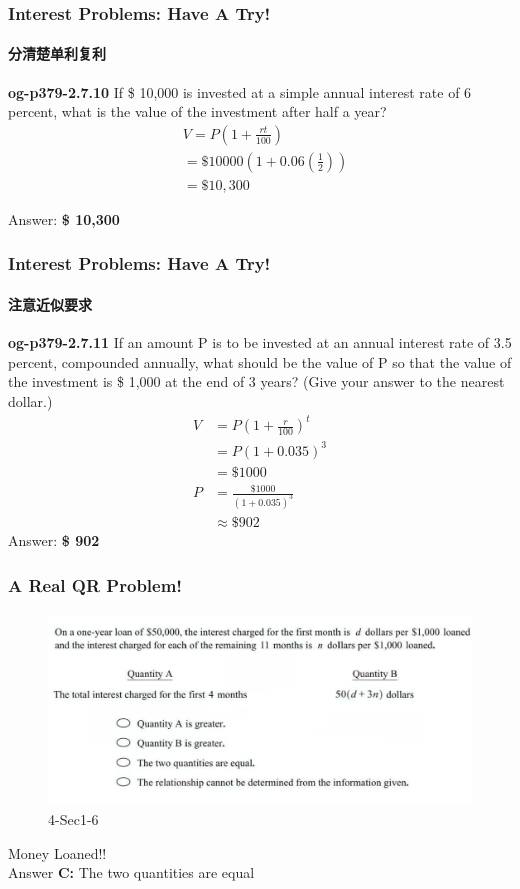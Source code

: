 \documentclass[
	11pt, %
	handout,
]{beamer}
\begin{document}


\begin{frame}
	\frametitle{Interest Problems: Have A Try!}
	\framesubtitle{分清楚单利复利}
	\textbf{og-p379-2.7.10}
If \$ 10,000 is invested at a simple annual interest rate of 6 percent, what is the value of the investment after half a year?
	\bigskip
	\pause
	\begin{equation*}
	  \begin{aligned}
	  		&V =P(1 + \frac{rt}{100})\\
		    &= \$ 10000(1+0.06 (\frac{1}{2}))\\
		    &= \$ 10,300
	  \end{aligned}
	\end{equation*}

	\pause
	\bigskip
	Answer: \textbf{\$ 10,300}
\end{frame}



\begin{frame}
	\frametitle{Interest Problems: Have A Try!}
	\framesubtitle{注意近似要求}
	\textbf{og-p379-2.7.11}
If an amount P is to be invested at an annual interest rate
of 3.5 percent, compounded annually, what should be the value of P so
that the value of the investment is \$ 1,000 at the end of 3 years? (Give your
answer to the nearest dollar.)
	\bigskip
	\pause
	\begin{equation*}
		\begin{aligned}
					V &=P(1 + \frac{r}{100})^t \\
					  &= P(1+ 0.035)^3\\
					  &= \$ 1000 \\
			    P &= \frac{\$ 1000 }{(1+ 0.035)^3}\\
			      &\approx \$ 902 					 
		\end{aligned}		
	\end{equation*}
	\pause
	\bigskip
	Answer: \textbf{\$ 902 }
\end{frame}



\begin{frame}
	\frametitle{A Real QR Problem!}
	\framesubtitle{}
	\begin{figure}
		\includegraphics[width=\linewidth]{Interest_Example_Question1.png}
		\caption{4-Sec1-6}
	\end{figure}
	\pause
\alert{Money Loaned!!}\\
	\bigskip
	Answer \textbf{C: } The two quantities are equal
\end{frame}
\end{document}
